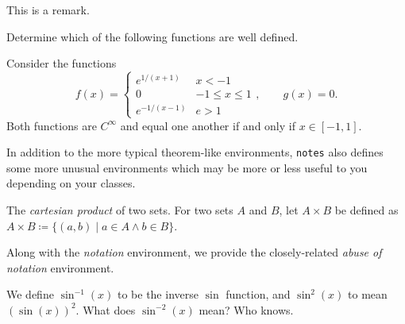 \documentclass[code]{notes}
\begin{document}
	\begin{remark}
		This is a remark.
	\end{remark}
	\begin{problem}
		Determine which of the following functions are well defined.
		\begin{parts}\relax
			\part\relax $f(a/b) = a$;
			\part\relax $f(a/b) = a^2/b^2$.
		\end{parts}
	\end{problem}
	\begin{example}
		Consider the functions 
		\[ f(x) = \begin{cases}
						e^{1/(x+1)} & x < -1 \\
						0 & -1 \leq x \leq 1 \\
						e^{-1/(x-1)} & e > 1
		           \end{cases},\qquad g(x) = 0. \]
		Both functions are $C^\infty$ and equal one another if and only if $x \in [-1,1]$.
	\end{example}
	In addition to the more typical theorem-like environments, \texttt{notes} also defines some more unusual environments which may be more or less useful to you depending on your classes.
	\begin{notation}[$\times$]
		The \emph{cartesian product} of two sets. For two sets $A$ and $B$, let $A \times B$ be defined as $A \times B \coloneqq \{(a,b) \mid a \in A \land b \in B\}$.
	\end{notation}
	Along with the \emph{notation} environment, we provide the closely-related \emph{abuse of notation} environment.
	\begin{abuse}
		We define $\sin^{-1}(x)$ to be the inverse $\sin$ function, and $\sin^2(x)$ to mean $(\sin(x))^2$. What does $\sin^{-2}(x)$ mean? Who knows.
	\end{abuse}
\end{document}
